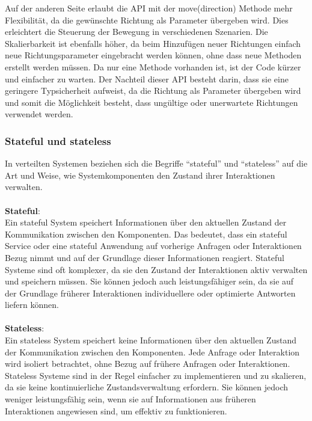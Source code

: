 Auf der anderen Seite erlaubt die API mit der move(direction) Methode mehr Flexibilität, da die gewünschte Richtung als Parameter übergeben wird. Dies erleichtert die Steuerung der Bewegung in verschiedenen Szenarien. Die Skalierbarkeit ist ebenfalls höher, da beim Hinzufügen neuer Richtungen einfach neue Richtungsparameter eingebracht werden können, ohne dass neue Methoden erstellt werden müssen. Da nur eine Methode vorhanden ist, ist der Code kürzer und einfacher zu warten. Der Nachteil dieser API besteht darin, dass sie eine geringere Typsicherheit aufweist, da die Richtung als Parameter übergeben wird und somit die Möglichkeit besteht, dass ungültige oder unerwartete Richtungen verwendet werden.

\subsubsection{Stateful und stateless}
In verteilten Systemen beziehen sich die Begriffe \enquote{stateful} und \enquote{stateless} auf die Art und Weise, wie Systemkomponenten den Zustand ihrer Interaktionen verwalten.
\\\\
\textbf{Stateful}:\\
Ein stateful System speichert Informationen über den aktuellen Zustand der Kommunikation zwischen den Komponenten. Das bedeutet, dass ein stateful Service oder eine stateful Anwendung auf vorherige Anfragen oder Interaktionen Bezug nimmt und auf der Grundlage dieser Informationen reagiert. Stateful Systeme sind oft komplexer, da sie den Zustand der Interaktionen aktiv verwalten und speichern müssen. Sie können jedoch auch leistungsfähiger sein, da sie auf der Grundlage früherer Interaktionen individuellere oder optimierte Antworten liefern können.
\\\\
\textbf{Stateless}:\\
Ein stateless System speichert keine Informationen über den aktuellen Zustand der Kommunikation zwischen den Komponenten. Jede Anfrage oder Interaktion wird isoliert betrachtet, ohne Bezug auf frühere Anfragen oder Interaktionen. Stateless Systeme sind in der Regel einfacher zu implementieren und zu skalieren, da sie keine kontinuierliche Zustandsverwaltung erfordern. Sie können jedoch weniger leistungsfähig sein, wenn sie auf Informationen aus früheren Interaktionen angewiesen sind, um effektiv zu funktionieren.
\\\\
